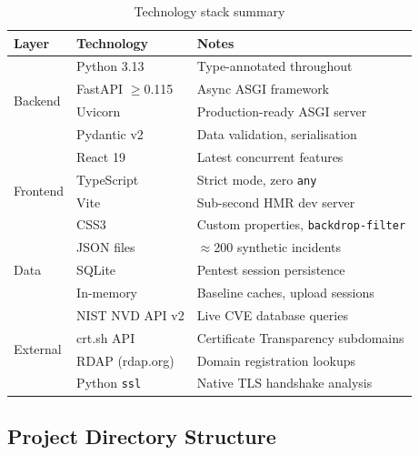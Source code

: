 \documentclass[12pt,a4paper]{article}
\begin{document}
\begin{table}[H]
\centering
\caption{Technology stack summary}
\begin{tabular}{lll}
\toprule
\textbf{Layer} & \textbf{Technology} & \textbf{Notes} \\
\midrule
\multirow{4}{*}{Backend}
  & Python 3.13          & Type-annotated throughout \\
  & FastAPI $\geq$0.115  & Async ASGI framework \\
  & Uvicorn              & Production-ready ASGI server \\
  & Pydantic v2          & Data validation, serialisation \\
\midrule
\multirow{4}{*}{Frontend}
  & React 19             & Latest concurrent features \\
  & TypeScript           & Strict mode, zero \texttt{any} \\
  & Vite                 & Sub-second HMR dev server \\
  & CSS3                 & Custom properties, \texttt{backdrop-filter} \\
\midrule
\multirow{3}{*}{Data}
  & JSON files           & $\approx$200 synthetic incidents \\
  & SQLite               & Pentest session persistence \\
  & In-memory            & Baseline caches, upload sessions \\
\midrule
\multirow{4}{*}{External}
  & NIST NVD API v2      & Live CVE database queries \\
  & crt.sh API           & Certificate Transparency subdomains \\
  & RDAP (rdap.org)      & Domain registration lookups \\
  & Python \texttt{ssl}  & Native TLS handshake analysis \\
\bottomrule
\end{tabular}
\end{table}

\subsection{Project Directory Structure}
\end{document}
